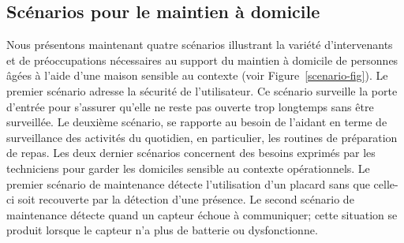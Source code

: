 



\subsection{Scénarios pour le maintien à domicile}\label{domain:scenario}
Nous présentons maintenant quatre scénarios illustrant la variété d'intervenants et de préoccupations nécessaires au support du maintien à domicile de personnes âgées à l'aide d'une maison sensible au contexte (voir Figure~\ref{scenario-fig}). Le premier scénario adresse la sécurité de l'utilisateur. Ce scénario surveille la porte d'entrée pour s'assurer qu'elle ne reste pas ouverte trop longtemps sans être surveillée. Le deuxième scénario, se rapporte au besoin de l'aidant en terme de surveillance des activités du quotidien, en particulier, les routines de préparation de repas. Les deux dernier scénarios concernent des besoins exprimés par les techniciens pour garder les domiciles sensible au contexte opérationnels. Le premier scénario de maintenance détecte l'utilisation d'un placard sans que celle-ci soit recouverte par la détection d'une présence. Le second scénario de maintenance détecte quand un capteur échoue à communiquer; cette situation se produit lorsque le capteur n'a plus de batterie ou dysfonctionne.

